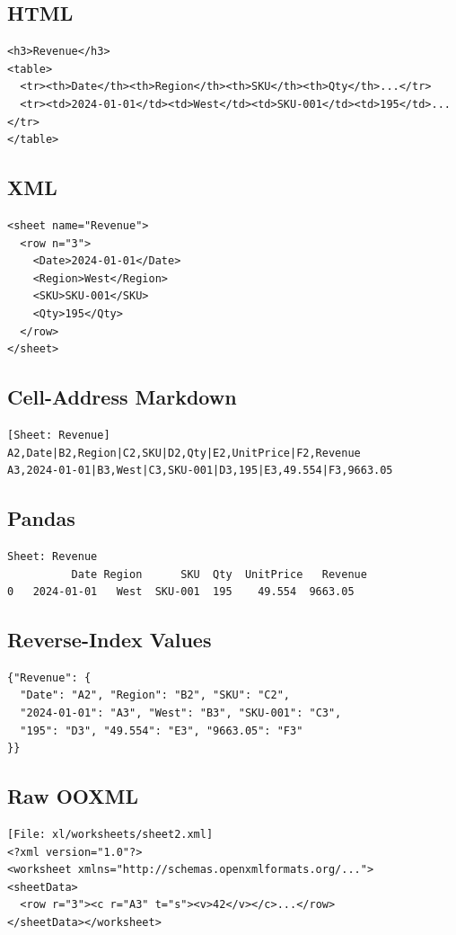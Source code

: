 \documentclass[11pt]{article}
\begin{document}
\subsection{HTML}
\begin{lstlisting}
<h3>Revenue</h3>
<table>
  <tr><th>Date</th><th>Region</th><th>SKU</th><th>Qty</th>...</tr>
  <tr><td>2024-01-01</td><td>West</td><td>SKU-001</td><td>195</td>...</tr>
</table>
\end{lstlisting}

\subsection{XML}
\begin{lstlisting}
<sheet name="Revenue">
  <row n="3">
    <Date>2024-01-01</Date>
    <Region>West</Region>
    <SKU>SKU-001</SKU>
    <Qty>195</Qty>
  </row>
</sheet>
\end{lstlisting}

\subsection{Cell-Address Markdown}
\begin{lstlisting}
[Sheet: Revenue]
A2,Date|B2,Region|C2,SKU|D2,Qty|E2,UnitPrice|F2,Revenue
A3,2024-01-01|B3,West|C3,SKU-001|D3,195|E3,49.554|F3,9663.05
\end{lstlisting}

\subsection{Pandas}
\begin{lstlisting}
Sheet: Revenue
          Date Region      SKU  Qty  UnitPrice   Revenue
0   2024-01-01   West  SKU-001  195    49.554  9663.05
\end{lstlisting}

\subsection{Reverse-Index Values}
\begin{lstlisting}
{"Revenue": {
  "Date": "A2", "Region": "B2", "SKU": "C2",
  "2024-01-01": "A3", "West": "B3", "SKU-001": "C3",
  "195": "D3", "49.554": "E3", "9663.05": "F3"
}}
\end{lstlisting}

\subsection{Raw OOXML}
\begin{lstlisting}
[File: xl/worksheets/sheet2.xml]
<?xml version="1.0"?>
<worksheet xmlns="http://schemas.openxmlformats.org/...">
<sheetData>
  <row r="3"><c r="A3" t="s"><v>42</v></c>...</row>
</sheetData></worksheet>
\end{lstlisting}
\end{document}
